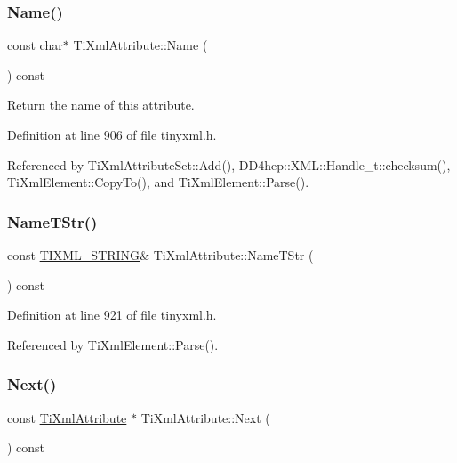 \subsubsection{\texorpdfstring{Name()}{Name()}}
{\footnotesize\ttfamily const char$\ast$ Ti\+Xml\+Attribute\+::\+Name (\begin{DoxyParamCaption}{ }\end{DoxyParamCaption}) const\hspace{0.3cm}{\ttfamily [inline]}}



Return the name of this attribute. 



Definition at line 906 of file tinyxml.\+h.



Referenced by Ti\+Xml\+Attribute\+Set\+::\+Add(), D\+D4hep\+::\+X\+M\+L\+::\+Handle\+\_\+t\+::checksum(), Ti\+Xml\+Element\+::\+Copy\+To(), and Ti\+Xml\+Element\+::\+Parse().

\hypertarget{class_ti_xml_attribute_a2bd49ec37463a0a2d081e6587f8b89b8}{}\label{class_ti_xml_attribute_a2bd49ec37463a0a2d081e6587f8b89b8} 
\subsubsection{\texorpdfstring{Name\+T\+Str()}{NameTStr()}}
{\footnotesize\ttfamily const \hyperlink{tinyxml_8h_a92bada05fd84d9a0c9a5bbe53de26887}{T\+I\+X\+M\+L\+\_\+\+S\+T\+R\+I\+NG}\& Ti\+Xml\+Attribute\+::\+Name\+T\+Str (\begin{DoxyParamCaption}{ }\end{DoxyParamCaption}) const\hspace{0.3cm}{\ttfamily [inline]}}



Definition at line 921 of file tinyxml.\+h.



Referenced by Ti\+Xml\+Element\+::\+Parse().

\hypertarget{class_ti_xml_attribute_af2e78f1ba9ed56a26ddc80614ed1c393}{}\label{class_ti_xml_attribute_af2e78f1ba9ed56a26ddc80614ed1c393} 
\subsubsection{\texorpdfstring{Next()}{Next()}\hspace{0.1cm}{\footnotesize\ttfamily [1/2]}}
{\footnotesize\ttfamily const \hyperlink{class_ti_xml_attribute}{Ti\+Xml\+Attribute} $\ast$ Ti\+Xml\+Attribute\+::\+Next (\begin{DoxyParamCaption}{ }\end{DoxyParamCaption}) const}




